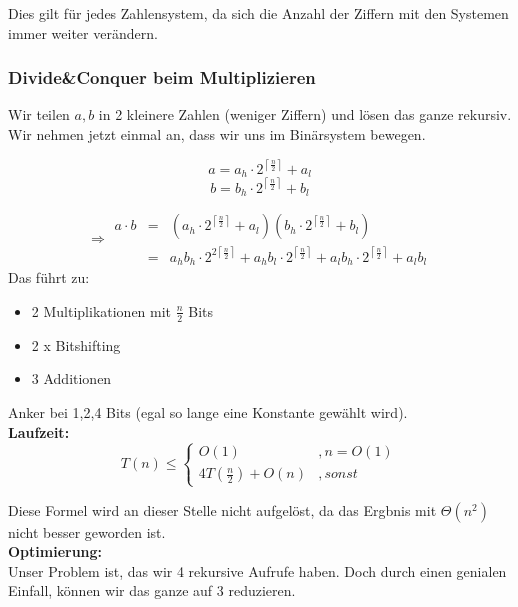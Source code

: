 Dies gilt für jedes Zahlensystem, da sich die Anzahl der Ziffern mit den Systemen immer weiter verändern.\\

\subsubsection{Divide\&Conquer beim Multiplizieren}

Wir teilen $a,b$ in 2 kleinere Zahlen (weniger Ziffern) und lösen das ganze rekursiv. Wir nehmen jetzt einmal an, dass wir uns im Binärsystem bewegen.

$$
a = a_h \cdot 2^{\left\lceil \frac{n}{2} \right\rceil} + a_l
$$
$$
b = b_h \cdot 2^{\left\lceil \frac{n}{2} \right\rceil} + b_l
$$

$$
\Rightarrow \begin{array}{rcl}
a \cdot b &=& \left( a_h \cdot 2^{\left\lceil \frac{n}{2} \right\rceil} + a_l \right) \left( b_h \cdot 2^{\left\lceil \frac{n}{2} \right\rceil} + b_l \right)\\
&=& a_hb_h \cdot 2^{2 \left\lceil \frac{n}{2} \right\rceil} + a_hb_l \cdot 2^{\left\lceil \frac{n}{2} \right\rceil}+ a_lb_h \cdot 2^{\left\lceil \frac{n}{2} \right\rceil} + a_lb_l
\end{array}
$$
Das führt zu:
\begin{itemize}
\item 2 Multiplikationen mit $\frac{n}{2}$ Bits
\item 2 x Bitshifting
\item 3 Additionen
\end{itemize}
Anker bei 1,2,4 Bits (egal so lange eine Konstante gewählt wird).\\

\textbf{Laufzeit:}
$$
T(n) \leq \left\{ \begin{array}{lr}
O(1) &, n = O(1)\\
4 T(\frac{n}{2}) + O(n) &, sonst
\end{array} \right.
$$

Diese Formel wird an dieser Stelle nicht aufgelöst, da das Ergbnis mit $\Theta (n^2)$ nicht besser geworden ist.\\

\textbf{Optimierung:}\\

Unser Problem ist, das wir 4 rekursive Aufrufe haben. Doch durch einen genialen Einfall, können wir das ganze auf 3 reduzieren.\\


